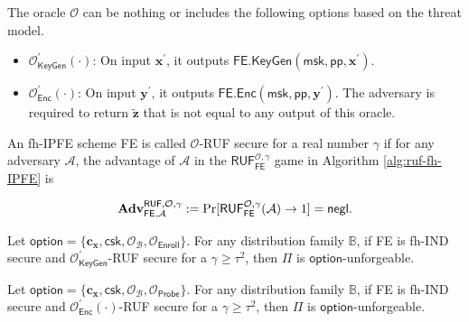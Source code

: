 The oracle $\mathcal{O}$ can be nothing or includes the following options based on the threat model.

\begin{itemize}

	\item $\mathcal{O}^\prime_{\textsf{KeyGen}}(\cdot)$: On input $\mathbf{x}^\prime$, it outputs $\textsf{FE.KeyGen}(\textsf{msk}, \textsf{pp}, \mathbf{x}^\prime)$.
	
	\item $\mathcal{O}^\prime_{\textsf{Enc}}(\cdot)$: On input $\mathbf{y}^\prime$, it outputs $\textsf{FE.Enc}(\textsf{msk}, \textsf{pp}, \mathbf{y}^\prime)$. The adversary is required to return $\mathbf{\tilde{z}}$ that is not equal to any output of this oracle.
\end{itemize}


\begin{definition}

	An fh-IPFE scheme \textsf{FE} is called $\mathcal{O}$-RUF secure for a real number $\gamma$ if for any adversary $\mathcal{A}$, the advantage of $\mathcal{A}$ in the $\textsf{RUF}^{\mathcal{O}, \gamma}_\textsf{FE}$ game in Algorithm \ref{alg:ruf-fh-IPFE} is

\[
	\mathbf{Adv}_{\textsf{FE}, \mathcal{A}}^{\textsf{RUF}, \mathcal{O}, \gamma} := \Pr[\textsf{RUF}^{\mathcal{O}, \gamma}_{\textsf{FE}}(\mathcal{A}) \to 1 ] = \mathsf{negl}.
\]

\end{definition}

\begin{theorem}
	Let $\textsf{option} = \{ \mathbf{c_x}, \textsf{csk}, \mathcal{O}_\mathcal{B}, \mathcal{O}_{\textsf{Enroll}} \}$. For any distribution family $\mathbb{B}$, if \textsf{FE} is fh-IND secure and $\mathcal{O}^\prime_{\textsf{KeyGen}}$-RUF secure for a $\gamma \geq \tau^2$, then $\Pi$ is $\textsf{option}$-unforgeable. 
\end{theorem}


\begin{theorem}
	Let $\textsf{option} = \{\mathbf{c_x}, \textsf{csk}, \mathcal{O}_\mathcal{B}, \mathcal{O}_\textsf{Probe}\}$. For any distribution family $\mathbb{B}$, if \textsf{FE} is fh-IND secure and $\mathcal{O}^\prime_{\textsf{Enc}}(\cdot)$-RUF secure for a $\gamma \geq \tau^2$, then $\Pi$ is $\textsf{option}$-unforgeable. 
\end{theorem}




